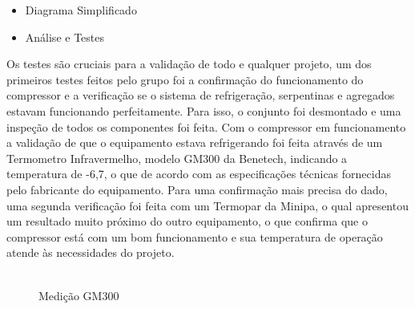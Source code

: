 \begin{itemize}
\item Diagrama Simplificado
\end{itemize}

\begin{itemize}
\item Análise e Testes
\end{itemize}
			 Os testes são cruciais para a validação de todo e qualquer projeto, um dos primeiros testes feitos pelo grupo foi a confirmação do funcionamento do compressor e a verificação se o sistema de refrigeração, serpentinas e agregados estavam funcionando perfeitamente. Para isso, o conjunto foi desmontado e uma inspeção de todos os componentes foi feita. Com o compressor em funcionamento a validação de que o equipamento estava refrigerando foi feita através de um Termometro Infravermelho, modelo GM300 da Benetech, indicando a temperatura de -6,7\degree, o que de acordo com as especificações técnicas fornecidas pelo fabricante do equipamento. Para uma confirmação mais precisa do dado, uma segunda verificação foi feita com um Termopar da Minipa, o qual apresentou um resultado muito próximo do outro equipamento, o que confirma que o compressor está com um bom funcionamento e sua temperatura de operação atende às necessidades do projeto.
             
                   \begin{figure}[H]
    \centering
    \includegraphics[width=0.7]{figuras/medicao_laser}
    \caption{Medição GM300}
    \label{fig:medicao_laser}
\end{figure}                 

